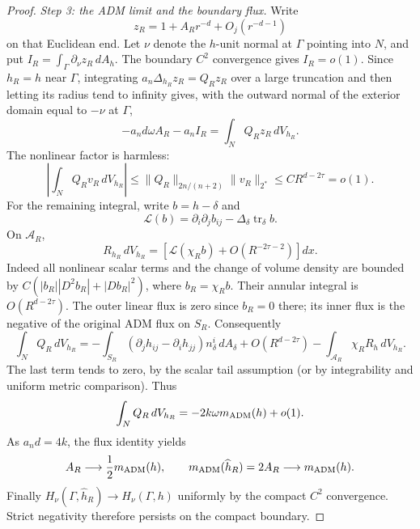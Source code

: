 \begin{proof}
\smallskip\noindent\emph{Step 3: the ADM limit and the boundary flux.}
Write
\[
 z_R=1+A_Rr^{-d}+O_j(r^{-d-1})
\]
on that Euclidean end. Let \(\nu\) denote the \(h\)-unit normal at
\(\Gamma\) pointing into \(N\), and put
\(I_R=\int_\Gamma\partial_\nu z_R\,dA_h\).
The boundary \(C^2\) convergence gives \(I_R=o(1)\).
Since \(h_R=h\) near \(\Gamma\), integrating
\(a_n\Delta_{h_R}z_R=Q_Rz_R\) over a large truncation and then
letting its radius tend to infinity gives, with the outward
normal of the exterior domain equal to \(-\nu\) at \(\Gamma\),
\[
 -a_n d\omega A_R-a_n I_R
       =\int_N Q_Rz_R\,dV_{h_R}.
\]
The nonlinear factor is harmless:
\[
 \left|\int_NQ_Rv_R\,dV_{h_R}\right|
 \le\|Q_R\|_{2n/(n+2)}\|v_R\|_{2^*}
 \le C R^{d-2\tau}=o(1).
\]
For the remaining integral, write \(b=h-\delta\) and
\[
 \mathcal L(b)=\partial_i\partial_jb_{ij}
                         -\Delta_\delta\operatorname{tr}_\delta b.
\]
On \(\mathcal A_R\),
\[
 R_{h_R}\,dV_{h_R}
 =\left[\mathcal L(\chi_Rb)
                  +O(R^{-2\tau-2})\right]dx.
\]
Indeed all nonlinear scalar terms and the change of volume density
are bounded by \(C(|b_R||D^2b_R|+|Db_R|^2)\), where
\(b_R=\chi_Rb\). Their annular integral is \(O(R^{d-2\tau})\).
The outer linear flux is zero since \(b_R=0\) there; its inner flux
is the negative of the original ADM flux on \(S_R\). Consequently
\[
 \int_N Q_R\,dV_{h_R}
 =-\int_{S_R}(\partial_jh_{ij}-\partial_ih_{jj})n_\delta^i\,dA_\delta
     +O(R^{d-2\tau})
     -\int_{\mathcal A_R}\chi_RR_h\,dV_{h_R}.
\]
The last term tends to zero, by the scalar tail assumption
(or by integrability and uniform metric comparison). Thus
\[
 \int_NQ_R\,dV_{h_R}=-2k\omega m_{\rm ADM}(h)+o(1).
\]
As \(a_nd=4k\), the flux identity yields
\[
 A_R\longrightarrow \frac12m_{\rm ADM}(h),\qquad
 m_{\rm ADM}(\widehat h_R)=2A_R
                 \longrightarrow m_{\rm ADM}(h).
\]
Finally \(H_\nu(\Gamma,\widehat h_R)\to H_\nu(\Gamma,h)\)
uniformly by the compact \(C^2\) convergence. Strict negativity
therefore persists on the compact boundary.
\end{proof}

